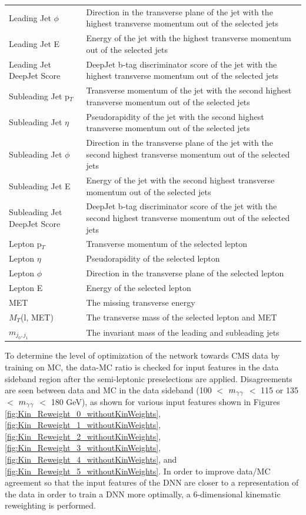 \begin{table}[H]
{\begin{tabular}{| l | l |}
Leading Jet $\phi$ & Direction in the transverse plane of the jet with the highest transverse momentum out of the selected jets \\
Leading Jet E & Energy of the jet with the highest transverse momentum out of the selected jets \\
Leading Jet DeepJet Score & DeepJet b-tag discriminator score of the jet with the highest transverse momentum out of the selected jets \\
Subleading Jet p$_T$ & Transverse momentum of the jet with the second highest transverse momentum out of the selected jets \\
Subleading Jet $\eta$ & Pseudorapidity of the jet with the second highest transverse momentum out of the selected jets \\
Subleading Jet $\phi$ & Direction in the transverse plane of the jet with the second highest transverse momentum out of the selected jets \\
Subleading Jet E & Energy of the jet with the second highest transverse momentum out of the selected jets \\
Subleading Jet DeepJet Score & DeepJet b-tag discriminator score of the jet with the second highest transverse momentum out of the selected jets \\
Lepton p$_{T}$ & Transverse momentum of the selected lepton \\ 
Lepton $\eta$ & Pseudorapidity of the selected lepton \\ 
Lepton $\phi$ & Direction in the transverse plane of the selected lepton \\ 
Lepton E & Energy of the selected lepton \\ 
MET & The missing transverse energy \\ 
$M_{T}$(l, MET) & The transverse mass of the selected lepton and MET \\
$m_{j_{0},j_{1}}$ & The invariant mass of the leading and subleading jets \\ 
\hline
\end{tabular}
}
\label{tab:SLinputvars}
\end{table}

To determine the level of optimization of the network towards CMS data by training on MC, the data-MC ratio is checked for input features in the data sideband region after the semi-leptonic preselections are applied. Disagreements are seen between data and MC in the data sideband (100 $<$ $m_{\gamma\gamma}$ $<$ 115 or 135 $<$ $m_{\gamma\gamma}$ $<$ 180 GeV), as shown for various input features shown 
in Figures \ref{fig:Kin_Reweight_0_withoutKinWeights}, 
\ref{fig:Kin_Reweight_1_withoutKinWeights}, \ref{fig:Kin_Reweight_2_withoutKinWeights}, \ref{fig:Kin_Reweight_3_withoutKinWeights}, \ref{fig:Kin_Reweight_4_withoutKinWeights}, and
\ref{fig:Kin_Reweight_5_withoutKinWeights}. In
order to improve data/MC agreement so that the input features of the DNN are closer to a representation of the data in order to train a DNN more optimally, a 6-dimensional kinematic reweighting is performed. 

